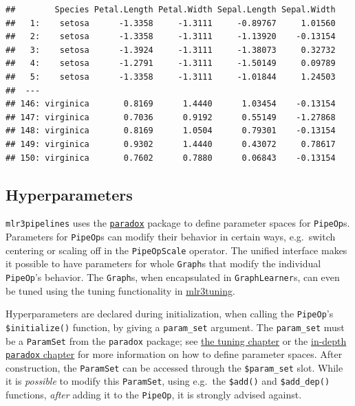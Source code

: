 \documentclass[
]{scrbook}
\begin{document}
\begin{verbatim}
##        Species Petal.Length Petal.Width Sepal.Length Sepal.Width
##   1:    setosa      -1.3358     -1.3111     -0.89767     1.01560
##   2:    setosa      -1.3358     -1.3111     -1.13920    -0.13154
##   3:    setosa      -1.3924     -1.3111     -1.38073     0.32732
##   4:    setosa      -1.2791     -1.3111     -1.50149     0.09789
##   5:    setosa      -1.3358     -1.3111     -1.01844     1.24503
##  ---                                                            
## 146: virginica       0.8169      1.4440      1.03454    -0.13154
## 147: virginica       0.7036      0.9192      0.55149    -1.27868
## 148: virginica       0.8169      1.0504      0.79301    -0.13154
## 149: virginica       0.9302      1.4440      0.43072     0.78617
## 150: virginica       0.7602      0.7880      0.06843    -0.13154
\end{verbatim}

\hypertarget{ext-pipe-hyperpars}{%
\subsection{Hyperparameters}\label{ext-pipe-hyperpars}}

\texttt{mlr3pipelines} uses the \href{https://paradox.mlr-org.com}{\texttt{paradox}} package to define parameter spaces for \texttt{PipeOp}s.
Parameters for \texttt{PipeOp}s can modify their behavior in certain ways, e.g.~switch centering or scaling off in the \texttt{PipeOpScale} operator.
The unified interface makes it possible to have parameters for whole \texttt{Graph}s that modify the individual \texttt{PipeOp}'s behavior.
The \texttt{Graph}s, when encapsulated in \texttt{GraphLearner}s, can even be tuned using the tuning functionality in \href{https://mlr3tuning.mlr-org.com}{mlr3tuning}.

Hyperparameters are declared during initialization, when calling the \texttt{PipeOp}'s \texttt{\$initialize()} function, by giving a \texttt{param\_set} argument.
The \texttt{param\_set} must be a \texttt{ParamSet} from the \texttt{paradox} package; see \protect\hyperlink{searchspace}{the tuning chapter} or the \protect\hyperlink{paradox}{in-depth \texttt{paradox} chapter} for more information on how to define parameter spaces.
After construction, the \texttt{ParamSet} can be accessed through the \texttt{\$param\_set} slot.
While it is \emph{possible} to modify this \texttt{ParamSet}, using e.g.~the \texttt{\$add()} and \texttt{\$add\_dep()} functions, \emph{after} adding it to the \texttt{PipeOp}, it is strongly advised against.
\end{document}
